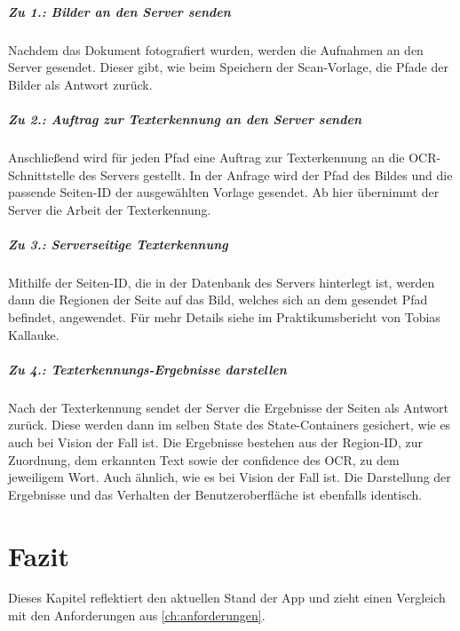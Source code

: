 \documentclass[notables, nomenclature, oneside, 150]{HSMW-Thesis}
\begin{document}
				\paragraph*{Zu 1.: Bilder an den Server senden}
				Nachdem das Dokument fotografiert wurden, werden die Aufnahmen an den Server gesendet. Dieser gibt, wie beim Speichern der Scan-Vorlage, die Pfade der Bilder als Antwort zurück. 
				
				\paragraph*{Zu 2.: Auftrag zur Texterkennung an den Server senden}
				Anschließend wird für jeden Pfad eine Auftrag zur Texterkennung an  die OCR-Schnittstelle des Servers gestellt. In der Anfrage wird der Pfad des Bildes und die passende Seiten-ID der ausgewählten Vorlage gesendet. Ab hier übernimmt der Server die Arbeit der Texterkennung.
				
				\paragraph*{Zu 3.: Serverseitige Texterkennung}
				Mithilfe der Seiten-ID, die in der Datenbank des Servers hinterlegt ist, werden dann die Regionen der Seite auf das Bild, welches sich an dem gesendet Pfad befindet, angewendet. Für mehr Details siehe im Praktikumsbericht von Tobias Kallauke. 
				
				\paragraph*{Zu 4.: Texterkennungs-Ergebnisse darstellen}
				Nach der Texterkennung sendet der Server die Ergebnisse der Seiten als Antwort zurück. Diese werden dann im selben State des State-Containers gesichert, wie es auch bei Vision der Fall ist. Die Ergebnisse bestehen aus der Region-ID, zur Zuordnung, dem erkannten Text sowie der confidence des OCR, zu dem jeweiligem Wort. Auch ähnlich, wie es bei Vision der Fall ist. Die Darstellung der Ergebnisse und das Verhalten der Benutzeroberfläche ist ebenfalls identisch.      


\chapter{Fazit}\label{ch:fazit}
	Dieses Kapitel reflektiert den aktuellen Stand der App und zieht einen Vergleich mit den Anforderungen aus \autoref{ch:anforderungen}.
	
\end{document}
